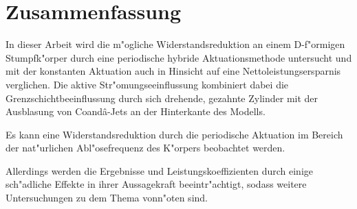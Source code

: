 \chapter*{Zusammenfassung}\label{s:uebersicht}

In dieser Arbeit wird die m"ogliche Widerstandsreduktion an einem D-f"ormigen Stumpfk"orper durch eine periodische hybride Aktuationsmethode untersucht und mit der konstanten Aktuation auch in Hinsicht auf eine Nettoleistungsersparnis verglichen.
Die aktive Str"omungseeinflussung kombiniert dabei die Grenzschichtbeeinflussung durch sich drehende, gezahnte Zylinder mit der Ausblasung von Coand\^{a}-Jets an der Hinterkante des Modells.

Es kann eine Widerstandsreduktion durch die periodische Aktuation im Bereich der nat"urlichen Abl"osefrequenz des K"orpers beobachtet werden.

Allerdings werden die Ergebnisse und Leistungskoeffizienten durch einige sch"adliche Effekte in ihrer Aussagekraft beeintr"achtigt, sodass weitere Untersuchungen zu dem Thema vonn"oten sind.
